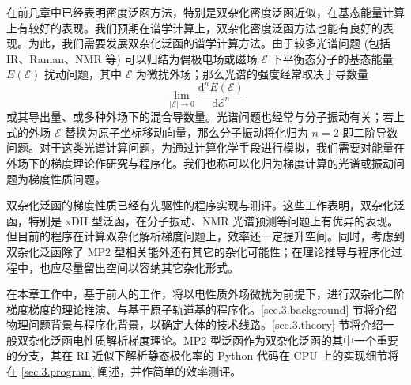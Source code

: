 在前几章中已经表明密度泛函方法，特别是双杂化密度泛函近似，在基态能量计算上有较好的表现。我们预期在谱学计算上，双杂化密度泛函方法也能有良好的表现。为此，我们需要发展双杂化泛函的谱学计算方法。由于较多光谱问题 (包括 IR、Raman、NMR 等) 可以归结为偶极电场或磁场 $\pmb{\mathcal{E}}$ 下平衡态分子的基态能量 $E(\pmb{\mathcal{E}})$ 扰动问题，其中 $\pmb{\mathcal{E}}$ 为微扰外场；那么光谱的强度经常取决于导数量
\begin{equation}
  \lim_{|\pmb{\mathcal{E}}| \rightarrow 0} \frac{\mathrm{d}^n E(\pmb{\mathcal{E}})}{\mathrm{d} \pmb{\mathcal{E}}^n}
\end{equation}
或其导出量、或多种外场下的混合导数量。光谱问题也经常与分子振动有关；若上式的外场 $\pmb{\mathcal{E}}$ 替换为原子坐标移动向量，那么分子振动将化归为 $n = 2$ 即二阶导数问题。对于这类光谱计算问题，为通过计算化学手段进行模拟，我们需要对能量在外场下的梯度理论作研究与程序化。我们也称可以化归为梯度计算的光谱或振动问题为\textsf{梯度性质}问题。

双杂化泛函的梯度性质已经有先驱性的程序实现与测评\cite{Neese-Grimme.JCP.2007, Biczysko-Barone.JCTC.2010, Su-Xu.JCC.2013, Stoychev-Neese.JCTC.2018, Gu-Xu.JCTC.2021, Yan-Xu.JCTC.2022}。这些工作表明，双杂化泛函，特别是 xDH 型泛函，在分子振动、NMR 光谱预测等问题上有优异的表现。但目前的程序在计算双杂化解析梯度问题上，效率还一定提升空间。同时，考虑到双杂化泛函除了 MP2 型相关能外还有其它的杂化可能性；在理论推导与程序化过程中，也应尽量留出空间以容纳其它杂化形式。

在本章工作中，基于前人的工作\cite{Gerratt-Mills.JCP.1968, Gerratt-Mills.JCP.1968a, Pople-Binkley.IJQC.1979, Dykstra-Jasien.CPL.1984, Handy-Schaefer.JCP.1984, Handy-Simandiras.CPL.1985, Pulay-Saeboe.TCA.1986, Trucks-Bartlett.CPL.1988, Frisch-Pople.CP.1990, Frisch-Pople.CPL.1990, Frisch-Pople.CPL.1990a, Gauss-Bartlett.JCP.1992, Stanton-Bartlett.CPL.1992, Johnson-Frisch.CPL.1993, Head-Gordon-Head-Gordon.CPL.1994, Yamaguchi-Schaefer.Oxford.1994, Weigend-Haeser.TCA.1997, Aikens-Gordon.TCA.2003, Cammi-Frisch.TCA.2004, Distasio-Head-Gordon.JCC.2007, Neese-Grimme.JCP.2007, Biczysko-Barone.JCTC.2010, Su-Xu.JCC.2013, Ji-Jung.JCTC.2013, Bykov-Neese.MP.2015, Stoychev-Neese.JCTC.2018, Gu-Xu.JCTC.2021, Yan-Xu.JCTC.2022}，将以电性质外场微扰为前提下，进行双杂化二阶梯度梯度的理论推演、与基于原子轨道基的程序化。\ref{sec.3.background} 节将介绍物理问题背景与程序化背景，以确定大体的技术线路。\ref{sec.3.theory} 节将介绍一般双杂化泛函电性质解析梯度理论。MP2 型泛函作为双杂化泛函的其中一个重要的分支，其在 RI 近似下解析静态极化率的 Python 代码在 CPU 上的实现细节将在 \ref{sec.3.program} 阐述，并作简单的效率测评。

